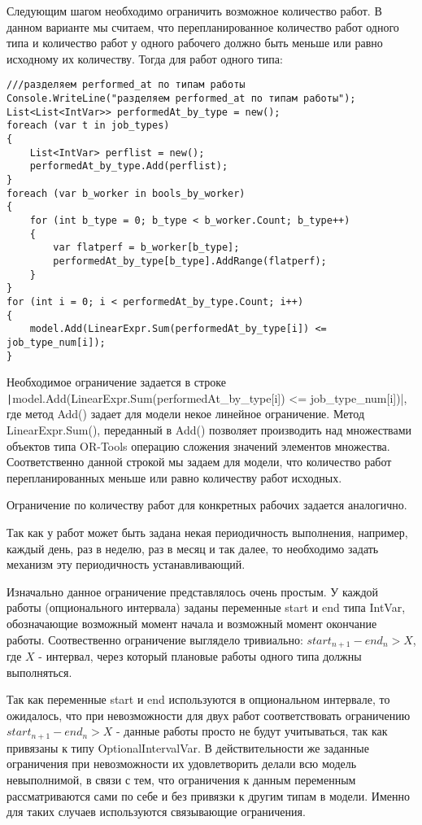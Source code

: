 Следующим шагом необходимо ограничить возможное количество работ. В данном варианте мы считаем, что перепланированное количество работ одного типа и количество работ у одного рабочего должно быть меньше или равно исходному их количеству. Тогда для работ одного типа:

\begin{verbatim}
///разделяем performed_at по типам работы
Console.WriteLine("разделяем performed_at по типам работы");
List<List<IntVar>> performedAt_by_type = new();
foreach (var t in job_types)
{
    List<IntVar> perflist = new();
    performedAt_by_type.Add(perflist);
}
foreach (var b_worker in bools_by_worker)
{
    for (int b_type = 0; b_type < b_worker.Count; b_type++)
    {
        var flatperf = b_worker[b_type];
        performedAt_by_type[b_type].AddRange(flatperf);
    }
}
for (int i = 0; i < performedAt_by_type.Count; i++)
{
    model.Add(LinearExpr.Sum(performedAt_by_type[i]) <= job_type_num[i]);
}
\end{verbatim}

Необходимое ограничение задается в строке \texttt|model.Add(LinearExpr.Sum(performedAt_by_type[i]) <= job_type_num[i])|, где метод Add() задает для модели некое линейное ограничение. Метод LinearExpr.Sum(), переданный в Add() позволяет производить над множествами объектов типа OR-Tools операцию сложения значений элементов множества. Соответственно данной строкой мы задаем для модели, что количество работ перепланированных меньше или равно количеству работ исходных.

Ограничение по количеству работ для конкретных рабочих задается аналогично.

Так как у работ может быть задана некая периодичность выполнения, например, каждый день, раз в неделю, раз в месяц и так далее, то необходимо задать механизм эту периодичность устанавливающий.

Изначально данное ограничение представлялось очень простым. У каждой работы (опционального интервала) заданы переменные start и end типа IntVar, обозначающие возможный момент начала и возможный момент окончание работы. Соотвественно ограничение выглядело тривиально: $start_{n+1} - end_n > X$, где $X$ - интервал, через который плановые работы одного типа должны выполняться.

Так как переменные start и end используются в опциональном интервале, то ожидалось, что при невозможности для двух работ соответствовать ограничению $start_{n+1} - end_n > X$ - данные работы просто не будут учитываться, так как привязаны к типу OptionalIntervalVar. В действительности же заданные ограничения при невозможности их удовлетворить делали всю модель невыполнимой, в связи с тем, что ограничения к данным переменным рассматриваются сами по себе и без привязки к другим типам в модели. Именно для таких случаев используются связывающие ограничения.


